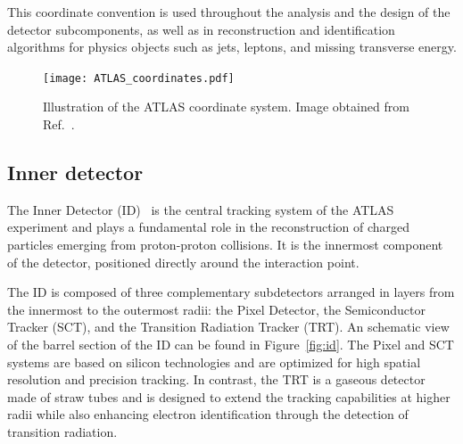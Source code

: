 This coordinate convention is used throughout the analysis and the design of the detector subcomponents, as well as in reconstruction and identification algorithms for physics objects such as jets, leptons, and missing transverse energy.
\begin{figure}[t]
    \centering
        \texttt{[image: ATLAS\_coordinates.pdf]}
    \caption{Illustration of the ATLAS coordinate system. Image obtained from Ref.~\cite{coordinates}.}
    \label{fig:coord}
\end{figure}

\subsection{Inner detector}
\label{sec:ID}


The Inner Detector (ID)~\cite{2010_id,ATLAS:exp} is the central tracking system of the ATLAS experiment and plays a fundamental role in the reconstruction of charged particles emerging from proton-proton collisions. It is the innermost component of the detector, positioned directly around the interaction point. 

The ID is composed of three complementary subdetectors arranged in layers from the innermost to the outermost radii: the Pixel Detector, the Semiconductor Tracker (SCT), and the Transition Radiation Tracker (TRT). An schematic view of the barrel section of the ID can be found in Figure~\ref{fig:id}.
The Pixel and SCT systems are based on silicon technologies and are optimized for high spatial resolution and precision tracking. In contrast, the TRT is a gaseous detector made of straw tubes and is designed to extend the tracking capabilities at higher radii while also enhancing electron identification through the detection of transition radiation.

